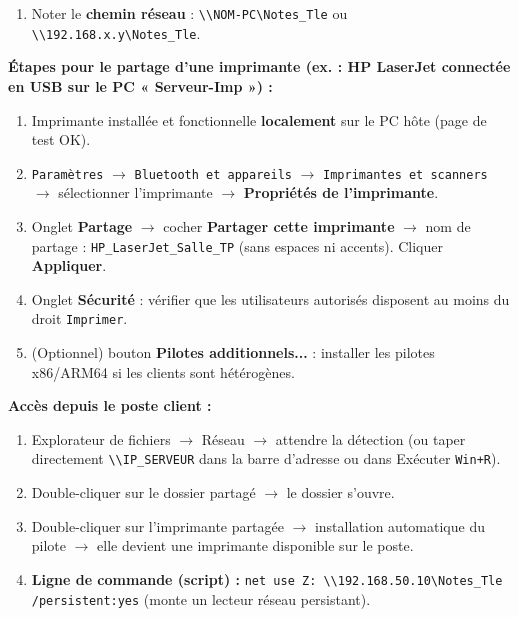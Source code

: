 \documentclass[11pt]{article}
\begin{document}
\begin{methode}
\begin{enumerate}
    \item Noter le \textbf{chemin réseau} : \texttt{\textbackslash\textbackslash NOM-PC\textbackslash Notes\_Tle} ou \texttt{\textbackslash\textbackslash 192.168.x.y\textbackslash Notes\_Tle}.
\end{enumerate}
\textbf{Étapes pour le partage d'une imprimante (ex. : HP LaserJet connectée en USB sur le PC « Serveur-Imp ») :}
\begin{enumerate}
    \item Imprimante installée et fonctionnelle \textbf{localement} sur le PC hôte (page de test OK).
    \item \texttt{Paramètres} $\rightarrow$ \texttt{Bluetooth et appareils} $\rightarrow$ \texttt{Imprimantes et scanners} $\rightarrow$ sélectionner l'imprimante $\rightarrow$ \textbf{Propriétés de l'imprimante}.
    \item Onglet \textbf{Partage} $\rightarrow$ cocher \textbf{Partager cette imprimante} $\rightarrow$ nom de partage : \texttt{HP\_LaserJet\_Salle\_TP} (sans espaces ni accents). Cliquer \textbf{Appliquer}.
    \item Onglet \textbf{Sécurité} : vérifier que les utilisateurs autorisés disposent au moins du droit \texttt{Imprimer}.
    \item (Optionnel) bouton \textbf{Pilotes additionnels...} : installer les pilotes x86/ARM64 si les clients sont hétérogènes.
\end{enumerate}
\textbf{Accès depuis le poste client :}
\begin{enumerate}
    \item Explorateur de fichiers $\rightarrow$ Réseau $\rightarrow$ attendre la détection (ou taper directement \texttt{\textbackslash\textbackslash IP\_SERVEUR} dans la barre d'adresse ou dans Exécuter \texttt{Win+R}).
    \item Double-cliquer sur le dossier partagé $\rightarrow$ le dossier s'ouvre.
    \item Double-cliquer sur l'imprimante partagée $\rightarrow$ installation automatique du pilote $\rightarrow$ elle devient une imprimante disponible sur le poste.
    \item \textbf{Ligne de commande (script) :} \texttt{net use Z: \textbackslash\textbackslash 192.168.50.10\textbackslash Notes\_Tle /persistent:yes} (monte un lecteur réseau persistant).
\end{enumerate}
\end{methode}
\end{document}
